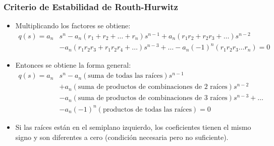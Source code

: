 \documentclass[aspectratio=169,handout]{beamer}
\theoremstyle{definition}
\theoremstyle{plain}
\theoremstyle{remark}
\begin{document}
\begin{frame}[<+->]\frametitle{Criterio de Estabilidad de Routh-Hurwitz}
\begin{itemize}
	\item Multiplicando los factores se obtiene:
	\begin{align*}
		q(s) = a_n& s^n - a_n(r_1 + r_2 + \dots + r_n)s^{n-1} + a_n(r_1r_2 + r_2r_3 + \dots)s^{n-2}\\
		&- a_n(r_1r_2r_3 + r_1r_2r_4 + \dots)s^{n-3} + \dots - a_n(-1)^n(r_1r_2r_3 \dots r_n) = 0
	\end{align*}
	\item Entonces se obtiene la forma general:
	\begin{align*}
		q(s) = a_n& s^n - a_n(\text{suma de todas las raíces})s^{n-1}\\
		&+ a_n(\text{suma de productos de combinaciones de 2 raíces})s^{n-2}\\
		&- a_n(\text{suma de productos de combinaciones de 3 raíces})s^{n-3} + \dots \\
		&- a_n(-1)^n(\text{productos de todas las raíces}) = 0
	\end{align*}
	\item Si las raíces están en el semiplano izquierdo, los coeficientes tienen el mismo signo y son diferentes a cero (condición necesaria pero no suficiente).
\end{itemize}
\end{frame}
\end{document}

